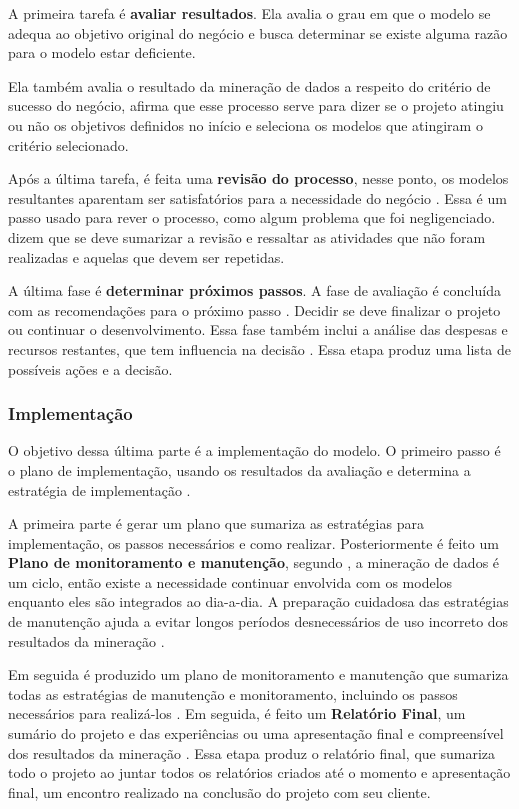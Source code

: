 A primeira tarefa é \textbf{avaliar resultados}. Ela avalia o grau em que o modelo se adequa ao objetivo original do negócio e busca determinar se existe alguma razão para o modelo estar deficiente.

Ela também avalia o resultado da mineração de dados a respeito do critério de sucesso do negócio,  afirma que esse processo serve para dizer se o projeto atingiu ou não os objetivos definidos no início e seleciona os modelos que atingiram o critério selecionado.

Após a última tarefa, é feita uma \textbf{revisão do processo}, nesse ponto, os modelos resultantes aparentam ser satisfatórios para a necessidade do negócio \citep{crispmanual}. Essa é um passo usado para rever o processo, como algum problema que foi negligenciado.  dizem que se deve sumarizar a revisão e ressaltar as atividades que não foram realizadas e aquelas que devem ser repetidas.

A última fase é \textbf{determinar próximos passos}. A fase de avaliação é concluída com as recomendações para o próximo passo \citep{dmfd}. Decidir se deve finalizar o projeto ou continuar o desenvolvimento. Essa fase também inclui a análise das despesas e recursos restantes, que tem influencia na decisão \citep{crispmanual}.
Essa etapa produz uma lista de possíveis ações e a decisão.

\subsubsection{Implementação}
O objetivo dessa última parte é a implementação do modelo.
O primeiro passo é o plano de implementação, usando os resultados da avaliação e determina a estratégia de implementação \citep{crispmanual}. 

A primeira parte é gerar um plano que sumariza as estratégias para implementação, os passos necessários e como realizar.
Posteriormente é feito um \textbf{Plano de monitoramento e manutenção}, segundo , a mineração de dados é um ciclo, então existe a necessidade continuar envolvida com os modelos enquanto eles são integrados ao dia-a-dia. A preparação cuidadosa das estratégias de manutenção ajuda a evitar longos períodos desnecessários de uso incorreto dos resultados da mineração \citep{crispmanual}.

Em seguida é produzido um plano de monitoramento e manutenção que sumariza todas as estratégias de manutenção e monitoramento, incluindo os passos necessários para realizá-los \citep{crispmanual}.
Em seguida, é feito um \textbf{Relatório Final}, um sumário do projeto e das experiências ou uma apresentação final e compreensível dos resultados da mineração \citep{crispmanual}.
Essa etapa produz o relatório final, que sumariza todo o projeto ao juntar todos os relatórios criados até o momento \citep{dmfd} e apresentação final, um encontro realizado na conclusão do projeto com seu cliente.

